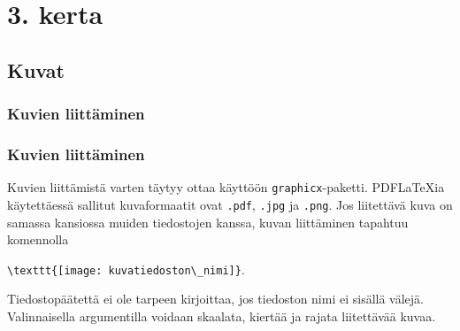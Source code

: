 


\setcounter{section}{2}
\begin{frame}
    \titlepage
\end{frame}
\begin{frame}
    \tableofcontents
\end{frame}
\section{3. kerta}
\subsection{Kuvat}
\subsubsection{Kuvien liittäminen}
\begin{frame}[fragile]
    \frametitle{Kuvien liittäminen}
    Kuvien liittämistä varten täytyy ottaa käyttöön \verb-graphicx--paketti. 
    \vaihto
    PDFLaTeXia käytettäessä sallitut kuvaformaatit ovat \verb-.pdf-, \verb-.jpg- ja \verb-.png-. 
    \vaihto
    Jos liitettävä kuva on samassa kansiossa muiden tiedostojen kanssa, kuvan liittäminen tapahtuu komennolla
    \begin{framed}
        \centering
        \verb-\texttt{[image: kuvatiedoston\_nimi]}-. 
    \end{framed}
    Tiedostopäätettä ei ole tarpeen kirjoittaa, jos tiedoston nimi ei sisällä välejä.
    \vaihto
    Valinnaisella argumentilla voidaan skaalata, kiertää ja rajata liitettävää kuvaa. 
\end{frame}
